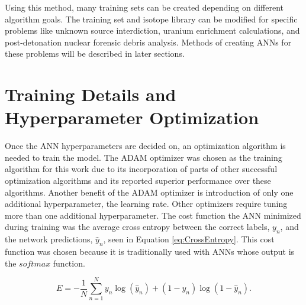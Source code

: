 \documentclass[tocnosub,noragright,centerchapter,12pt,fullpage]{uiucecethesis09}
\begin{document}
Using this method, many training sets can be created depending on different algorithm goals. The training set and isotope library can be modified for specific problems like unknown source interdiction, uranium enrichment calculations, and post-detonation nuclear forensic debris analysis. Methods of creating ANNs for these problems will be described in later sections.




\section{Training Details and Hyperparameter Optimization}

Once the ANN hyperparameters are decided on, an optimization algorithm is needed to train the model. The ADAM optimizer \cite{Kingma2015} was chosen as the training algorithm for this work due to its incorporation of parts of other successful optimization algorithms and its reported superior performance over these algorithms. Another benefit of the ADAM optimizer is introduction of only one additional hyperparameter, the learning rate. Other optimizers require tuning more than one additional hyperparameter. The cost function the ANN minimized during training was the average cross entropy between the correct labels, $y_n$, and the network predictions, $\hat{y}_n$, seen in Equation \ref{eq:CrossEntropy}. This cost function was chosen because it is traditionally used with ANNs whose output is the $softmax$ function. 

\begin{equation} \label{eq:CrossEntropy}
E = -{\frac{1} N} \sum_{n=1}^N y_n \log(\hat{y}_n) +  (1-y_n) \log(1-\hat{y}_n).
\end{equation}
\end{document}
